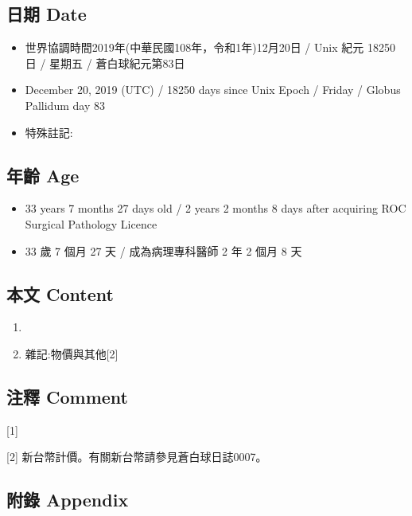\documentclass[a5paper, 12pt
]{book}
\providecommand{\tightlist}{%
  \setlength{\itemsep}{0pt}\setlength{\parskip}{0pt}}
\begin{document}
\hypertarget{ux65e5ux671f-date-19}{%
\subsection{日期 Date}\label{ux65e5ux671f-date-19}}

\begin{itemize}
\tightlist
\item
  世界協調時間2019年(中華民國108年，令和1年)12月20日 / Unix 紀元 18250
  日 / 星期五 / 蒼白球紀元第83日
\item
  December 20, 2019 (UTC) / 18250 days since Unix Epoch / Friday /
  Globus Pallidum day 83
\item
  特殊註記:
\end{itemize}

\hypertarget{ux5e74ux9f61-age-19}{%
\subsection{年齡 Age}\label{ux5e74ux9f61-age-19}}

\begin{itemize}
\tightlist
\item
  33 years 7 months 27 days old / 2 years 2 months 8 days after
  acquiring ROC Surgical Pathology Licence
\item
  33 歲 7 個月 27 天 / 成為病理專科醫師 2 年 2 個月 8 天
\end{itemize}

\hypertarget{ux672cux6587-content-19}{%
\subsection{本文 Content}\label{ux672cux6587-content-19}}

\begin{enumerate}
\def\labelenumi{\arabic{enumi}.}
\item
\item
  雜記:物價與其他{[}2{]}
\end{enumerate}

\hypertarget{ux6ce8ux91cb-comment-18}{%
\subsection{注釋 Comment}\label{ux6ce8ux91cb-comment-18}}

{[}1{]}

{[}2{]} 新台幣計價。有關新台幣請參見蒼白球日誌0007。

\hypertarget{ux9644ux9304-appendix-19}{%
\subsection{附錄 Appendix}\label{ux9644ux9304-appendix-19}}
\end{document}
